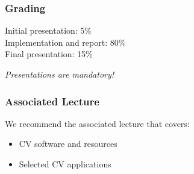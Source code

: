 \documentclass[xetex]{beamer}
\begin{document}

\begin{frame}
\frametitle{Grading}

Initial presentation: 5\% \\
Implementation and report: 80\% \\
Final presentation: 15\%

\bigskip
\emph{Presentations are mandatory!}

\end{frame}


\begin{frame}
\frametitle{Associated Lecture}

We recommend the associated lecture that covers:
\begin{itemize}
	\item CV software and resources
	\item Selected CV applications
\end{itemize}

\end{frame}
\end{document}
